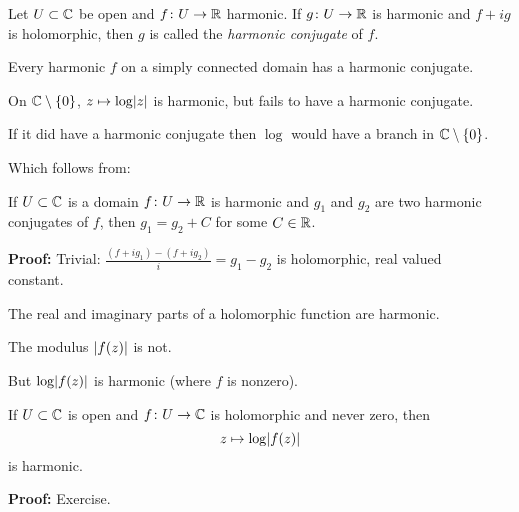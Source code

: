 \documentclass[10pt,aspectratio=169]{beamer}
\begin{document}
\begin{frame}
\begin{definition}
Let $U \subset {\mathbb{C}}$ be open and $f \colon U \to {\mathbb{R}}$ harmonic.
If $g \colon U \to {\mathbb{R}}$ is harmonic and $f + i g$ is holomorphic,
then $g$ is called the \emph{harmonic conjugate} of $f$.
\end{definition}

\pause

Every harmonic $f$ on a simply connected domain has a harmonic conjugate.

\medskip
\pause

On ${\mathbb{C}} \setminus \{ 0 \}$,
$z \mapsto \log \lvert {z} \rvert$ is harmonic, but
fails to have a harmonic conjugate.

\medskip
\pause

If it did have a harmonic conjugate
then $\log$ would have a branch in ${\mathbb{C}} \setminus \{0\}$.

\pause
Which follows from:

\begin{proposition}
If $U \subset {\mathbb{C}}$ is a domain $f \colon U \to {\mathbb{R}}$ is harmonic
and $g_1$ and $g_2$ are two harmonic conjugates of $f$,
then $g_1 = g_2 + C$ for some $C \in {\mathbb{R}}$.
\end{proposition}

\pause
\textbf{Proof:}
Trivial: 
$\frac{(f + i g_1) - (f + i g_2)}{i} =  g_1-g_2$
is holomorphic, real valued ~\thus~ constant.

\end{frame}

\begin{frame}
The real and imaginary parts of a holomorphic function are harmonic.

\pause
\medskip

The modulus $\lvert {f(z)} \rvert$ is not.

\pause
\medskip

But $\log \lvert {f(z)} \rvert$ is harmonic (where $f$ is nonzero).

\pause

\begin{proposition}
If $U \subset {\mathbb{C}}$ is open and $f \colon U \to {\mathbb{C}}$ is holomorphic
and never zero, then
\begin{equation*}
z \mapsto \log \lvert {f(z)} \rvert
\end{equation*}
is harmonic.
\end{proposition}

\textbf{Proof:} Exercise.
\end{frame}
\end{document}
